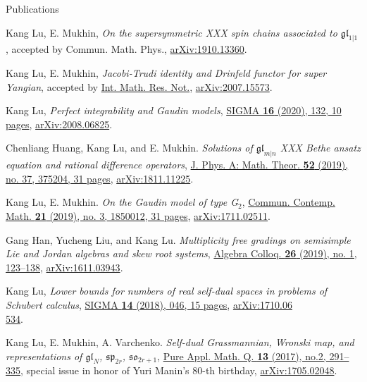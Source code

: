 \documentclass{resume} %
\begin{document}
\begin{rSection}{Publications}
\begin{etaremune}[leftmargin=0cm]
\item Kang Lu, E. Mukhin, {\it On the supersymmetric XXX spin chains associated to $\mathfrak{gl}_{1|1}$}, accepted by Commun. Math. Phys., \href{https://arxiv.org/abs/1910.13360}{arXiv:1910.13360}.

\item Kang Lu, E. Mukhin, {\it Jacobi-Trudi identity and Drinfeld functor for super Yangian}, accepted by \href{https://dx.doi.org/10.1093/imrn/rnab023}{Int. Math. Res. Not.}, \href{https://arxiv.org/abs/2007.15573}{arXiv:2007.15573}.

\item Kang Lu, {\it Perfect integrability and Gaudin models}, \href{https://doi.org/10.3842/SIGMA.2020.132}{SIGMA {\bf 16} (2020), 132, 10 pages}, \href{https://arxiv.org/abs/2008.06825}{arXiv:2008.06825}.

\item Chenliang Huang, Kang Lu, and E. Mukhin.
{\it Solutions of $\mathfrak{gl}_{m|n}$ XXX Bethe ansatz equation and rational difference operators}, \href{https://doi.org/10.1088/1751-8121/ab1960}{J. Phys. A: Math. Theor. \textbf{52} (2019), no. 37, 375204, 31 pages}, \href{https://arxiv.org/abs/1811.11225}{arXiv:1811.11225}.	
			
\item Kang Lu, E. Mukhin. 
{\it On the Gaudin model of type G$_2$}, \href{https://doi.org/10.1142/S0219199718500128}{Commun. Contemp. Math. \textbf{21} (2019), no. 3, 1850012, 31 pages}, \href{https://arxiv.org/abs/1711.02511}{arXiv:1711.02511}.

\item Gang Han, Yucheng Liu, and Kang Lu. {\it Multiplicity free gradings on semisimple Lie and Jordan algebras and skew root systems}, \href{https://doi.org/10.1142/S1005386719000129}{Algebra Colloq. {\bf 26} (2019), no. 1, 123--138}, \href{https://arxiv.org/abs/1611.03943}{arXiv:1611.03943}.
			
\item Kang Lu, {\it Lower bounds for numbers of real self-dual spaces in problems of Schubert calculus}, \href{https://doi.org/10.3842/SIGMA.2018.046}{SIGMA {\bf 14} (2018), 046, 15 pages}, \href{https://arxiv.org/abs/1710.06534}{arXiv:1710.06\\534}.	
			
\item Kang Lu, E. Mukhin, A. Varchenko. 
{\it Self-dual Grassmannian, Wronski map, and representations of $\mathfrak{gl}_N$, $\mathfrak{sp}_{2r}$, $\mathfrak{so}_{2r+1}$}, \href{http://dx.doi.org/10.4310/PAMQ.2017.v13.n2.a4}{Pure Appl. Math. Q. {\bf 13} (2017), no.2, 291--335}, special issue in honor of Yuri Manin's 80-th birthday, \href{https://arxiv.org/abs/1705.02048}{arXiv:1705.02048}.
					

\end{etaremune}
\end{rSection}
\end{document}
